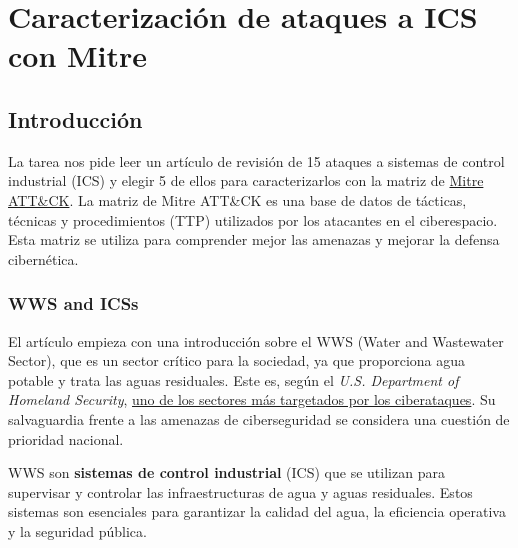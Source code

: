 \chapter{Caracterización de ataques a ICS con Mitre}
\label{chap:01}
\section*{Introducción}

La tarea nos pide leer un artículo de revisión de 15 ataques a sistemas de control industrial (ICS) y elegir 5 de ellos para caracterizarlos con la matriz de \href{attack.mitre.org/matrices/ics/}{Mitre ATT\&CK}. La matriz de Mitre ATT\&CK es una base de datos de tácticas, técnicas y procedimientos (TTP) utilizados por los atacantes en el ciberespacio. Esta matriz se utiliza para comprender mejor las amenazas y mejorar la defensa cibernética.


\subsection{\textsc{WWS} and ICSs}

El artículo empieza con una introducción sobre el \textsc{WWS} (Water and Wastewater Sector), que es un sector crítico para la sociedad, ya que proporciona agua potable y trata las aguas residuales. 
Este es, según el \textit{U.S. Department of Homeland Security}, \ul{uno de los sectores más targetados por los ciberataques}. Su salvaguardia frente a las amenazas de ciberseguridad se considera una cuestión de prioridad nacional.

\textsc{WWS} son \textbf{sistemas de control industrial} (\textsc{ICS}) que se utilizan para supervisar y controlar las infraestructuras de agua y aguas residuales. Estos sistemas son esenciales para garantizar la calidad del agua, la eficiencia operativa y la seguridad pública.

